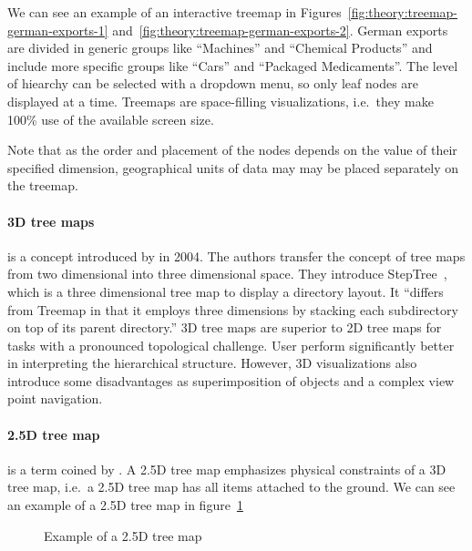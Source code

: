 \documentclass{article}
\newcommand{\tmap}{\textsc{2.5D} tree map}
\newcommand{\threedTmap}{\textsc{3D} tree map}
\newcommand{\threedTmaps}{\textsc{3D} tree maps}
\begin{document}
We can see an example of an interactive treemap in Figures~\ref{fig:theory:treemap-german-exports-1} and~\ref{fig:theory:treemap-german-exports-2}.
German exports are divided in generic groups like ``Machines'' and ``Chemical Products'' and include more specific groups like ``Cars'' and ``Packaged Medicaments''.
The level of hiearchy can be selected with a dropdown menu, so only leaf nodes are displayed at a time.
Treemaps are space-filling visualizations, i.e.\ they make 100\% use of the available screen size.

Note that as the order and placement of the nodes depends on the value of their specified dimension, geographical units of data may may be placed separately on the treemap.

\paragraph{\threedTmaps{}} is a concept introduced by \textcite{Bladh2004} in 2004.
The authors transfer the concept of tree maps from two dimensional into three dimensional space.
They introduce StepTree~\cite{Bladh2004}, which is a three dimensional tree map to display a directory layout.
It ``differs from Treemap in that it employs three dimensions by stacking each subdirectory on top of its parent directory.''
3D tree maps are superior to 2D tree maps for tasks with a pronounced topological challenge.
User perform significantly better in interpreting the hierarchical structure.
However, 3D visualizations also introduce some disadvantages as superimposition of objects and a complex view point navigation.

\paragraph{\tmap{}} is a term coined by \textcite{Limberger2016}.
A \tmap{} emphasizes physical constraints of a \threedTmap{}, i.e.\ a \tmap{} has all items attached to the ground.
We can see an example of a \tmap{} in figure~\ref{fig:research:ua_treemap}

\begin{figure}[h]
  \centering
  \caption{Example of a \tmap{}}\label{fig:research:ua_treemap}
\end{figure}
\end{document}
